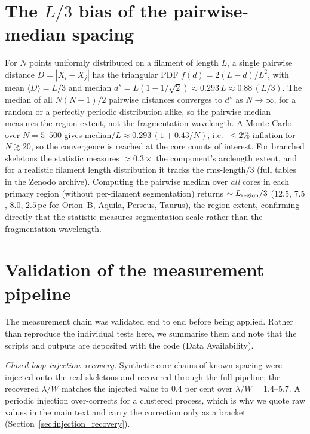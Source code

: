 \documentclass[usenatbib,twoside,twocolumn]{mnras}
\begin{document}
\section{The $L/3$ bias of the pairwise-median spacing}
\label{sec:pwmedian}
For $N$ points uniformly distributed on a filament of length $L$, a single pairwise distance $D=|X_i-X_j|$ has the triangular PDF $f(d)=2(L-d)/L^2$, with mean $\langle D\rangle=L/3$ and median $d^\star=L(1-1/\sqrt{2})\approx0.293\,L\approx0.88\,(L/3)$. The median of all $N(N-1)/2$ pairwise distances converges to $d^\star$ as $N\to\infty$, for a random or a perfectly periodic distribution alike, so the pairwise median measures the region extent, not the fragmentation wavelength. A Monte-Carlo over $N=5$--$500$ gives median$/L\approx0.293\,(1+0.43/N)$, i.e.\ $\le2\%$ inflation for $N\gtrsim20$, so the convergence is reached at the core counts of interest. For branched skeletons the statistic measures $\approx0.3\times$ the component's arclength extent, and for a realistic filament length distribution it tracks the rms-length$/3$ (full tables in the Zenodo archive). Computing the pairwise median over \emph{all} cores in each primary region (without per-filament segmentation) returns $\sim L_{\rm region}/3$ ($12.5$, $7.5$, $8.0$, $2.5$\,pc for Orion~B, Aquila, Perseus, Taurus), the region extent, confirming directly that the statistic measures segmentation scale rather than the fragmentation wavelength.

\section{Validation of the measurement pipeline}
\label{sec:validation}

The measurement chain was validated end to end before being applied. Rather than reproduce the individual tests here, we summarise them and note that the scripts and outputs are deposited with the code (Data Availability).

\emph{Closed-loop injection--recovery.} Synthetic core chains of known spacing were injected onto the real skeletons and recovered through the full pipeline; the recovered $\lambda/W$ matches the injected value to $0.4$ per cent over $\lambda/W=1.4$--$5.7$. A periodic injection over-corrects for a clustered process, which is why we quote raw values in the main text and carry the correction only as a bracket (Section~\ref{sec:injection_recovery}).
\end{document}
